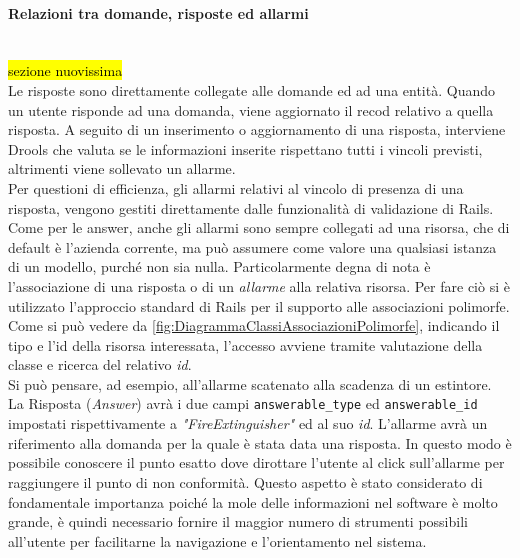 \paragraph*{Relazioni tra domande, risposte ed allarmi}\mbox{} \\
\hl{sezione nuovissima}\\
Le risposte sono direttamente collegate alle domande ed ad una entità. Quando un utente risponde ad una domanda, viene aggiornato il recod relativo a quella risposta. A seguito di un inserimento o aggiornamento di una risposta, interviene Drools che valuta se le informazioni inserite rispettano tutti i vincoli previsti, altrimenti viene sollevato un allarme. \\ Per questioni di efficienza, gli allarmi relativi al vincolo di presenza  di una risposta, vengono gestiti direttamente dalle funzionalità di validazione di Rails.\\
Come per le answer, anche gli allarmi sono sempre collegati ad una risorsa, che di default è l'azienda corrente, ma può assumere come valore una qualsiasi istanza di un modello, purché non sia nulla.
Particolarmente degna di nota è l'associazione di una risposta o di un \textit{allarme} alla relativa risorsa. Per fare ciò si è utilizzato l'approccio standard di Rails per il supporto alle associazioni polimorfe. \\  Come si può vedere da  \autoref{fig:DiagrammaClassiAssociazioniPolimorfe}, indicando il tipo e l'id della risorsa interessata, l'accesso avviene tramite valutazione della classe e ricerca del relativo \textit{id}. \\
Si può pensare, ad esempio, all'allarme scatenato alla scadenza di un estintore. \\
La Risposta (\textit{Answer}) avrà i due campi \texttt{answerable\_type} ed \texttt{answerable\_id} impostati rispettivamente a \textit{"FireExtinguisher"} ed al suo \textit{id}.  L'allarme avrà un riferimento alla domanda per la quale è stata data una risposta. In questo modo è possibile conoscere il punto esatto dove dirottare l'utente al click sull'allarme per raggiungere il punto di non conformità. Questo aspetto è stato considerato di fondamentale importanza poiché la mole delle informazioni nel software è molto grande, è quindi necessario fornire il maggior numero di strumenti possibili all'utente per facilitarne la navigazione e l'orientamento nel sistema.
